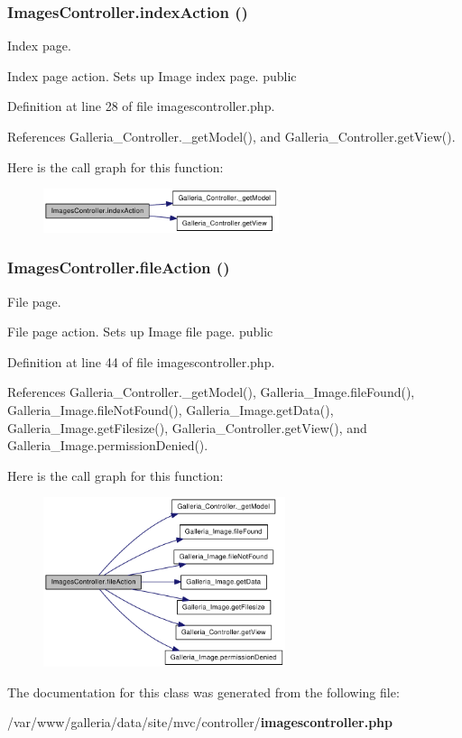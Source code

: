 \subsubsection{\setlength{\rightskip}{0pt plus 5cm}ImagesController.indexAction ()}\label{classImagesController_a02f71d36e50145429275bae193ba6f8}


Index page.

Index page action. Sets up Image index page.  public 

Definition at line 28 of file imagescontroller.php.

References Galleria\_\-Controller.\_\-getModel(), and Galleria\_\-Controller.getView().

Here is the call graph for this function:\nopagebreak
\begin{figure}[H]
\begin{center}
\leavevmode
\includegraphics[width=196pt]{classImagesController_a02f71d36e50145429275bae193ba6f8_cgraph}
\end{center}
\end{figure}
\subsubsection{\setlength{\rightskip}{0pt plus 5cm}ImagesController.fileAction ()}\label{classImagesController_e85225008713a833f25eca01070fc4fe}


File page.

File page action. Sets up Image file page.  public 

Definition at line 44 of file imagescontroller.php.

References Galleria\_\-Controller.\_\-getModel(), Galleria\_\-Image.fileFound(), Galleria\_\-Image.fileNotFound(), Galleria\_\-Image.getData(), Galleria\_\-Image.getFilesize(), Galleria\_\-Controller.getView(), and Galleria\_\-Image.permissionDenied().

Here is the call graph for this function:\nopagebreak
\begin{figure}[H]
\begin{center}
\leavevmode
\includegraphics[width=201pt]{classImagesController_e85225008713a833f25eca01070fc4fe_cgraph}
\end{center}
\end{figure}


The documentation for this class was generated from the following file:\begin{CompactItemize}
\item 
/var/www/galleria/data/site/mvc/controller/{\bf imagescontroller.php}\end{CompactItemize}

